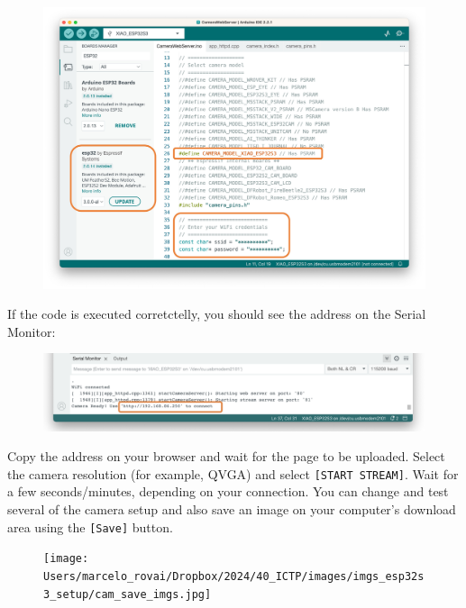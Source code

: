 \documentclass[
  letterpaper,
  DIV=11,
  numbers=noendperiod]{scrreprt}
\begin{document}
\begin{figure}[H]

{\centering \includegraphics{images/imgs_esp32s3_setup/ide-1.jpg}

}

\end{figure}

If the code is executed corretctelly, you should see the address on the
Serial Monitor:

\begin{figure}[H]

{\centering \includegraphics{images/imgs_esp32s3_setup/ide-2.png}

}

\end{figure}

Copy the address on your browser and wait for the page to be uploaded.
Select the camera resolution (for example, QVGA) and select
\texttt{{[}START\ STREAM{]}}. Wait for a few seconds/minutes, depending
on your connection. You can change and test several of the camera setup
and also save an image on your computer's download area using the
\texttt{{[}Save{]}} button.

\begin{figure}[H]

{\centering \texttt{[image: Users/marcelo\_rovai/Dropbox/2024/40\_ICTP/images/imgs\_esp32s3\_setup/cam\_save\_imgs.jpg]}

}

\end{figure}
\end{document}
